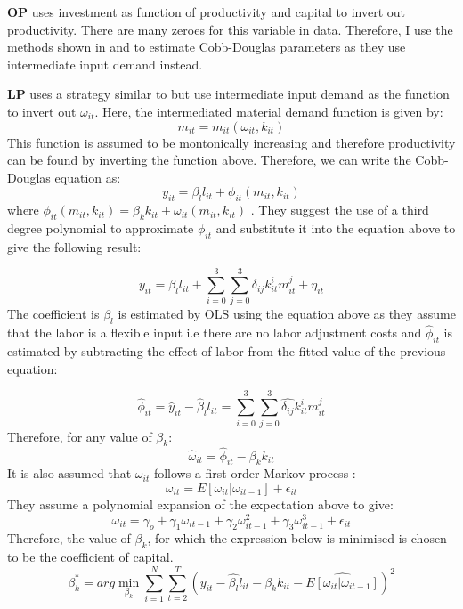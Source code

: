 \documentclass[12pt]{article}
\begin{document}
\textcite{olley1992dynamics} \textbf{OP} uses investment
 as function of productivity and capital to invert out productivity.  There are many zeroes for this variable in
 data. Therefore, I use the  methods shown in \textcite{levinsohn2003estimating} and
\textcite{ackerberg2006structural} to estimate Cobb-Douglas
parameters as they use  intermediate
input demand instead.  


\textcite{levinsohn2003estimating} \textbf{LP} uses a  strategy
similar to \textcite{olley1992dynamics} but use intermediate input demand
as the function to invert out $\omega_{it}$. 
Here, the intermediated material demand function is given by:
$$  m_{it} = m_{it}(\omega_{it}, k_{it})$$
This function is assumed to be montonically increasing and therefore
productivity can be found by inverting the function above. Therefore,
we can write the Cobb-Douglas equation  as: 
$$ y_{it} = \beta_{l}l_{it} + \phi_{it}(m_{it},k_{it})$$
where $\phi_{it}(m_{it},k_{it}) =  \beta_{k}k_{it}+ \omega_{it}(m_{it}, k_{it})$
. They suggest the  use of a third degree polynomial to approximate 
$\phi_{it}$ and substitute it into the equation above to give the
following result: 

$$  y_{it} =  \beta_{l}l_{it} + \sum_{i=0}^{3} \sum_{j=0}^{3}
\delta_{ij}k_{it}^{i}m_{it}^{j} + \eta_{it}$$
The coefficient is $\beta_{l}$ is estimated by OLS using the equation
above as they assume that the labor is a flexible input i.e there are
no labor adjustment costs and $\hat{\phi}_{it}$ is estimated by
subtracting the effect of labor from
the fitted value of the previous equation:


$$ \hat{\phi}_{it} = \hat{y}_{it} - \hat{\beta}_{l}l_{it} =
 \sum_{i=0}^{3} \sum_{j=0}^{3}
\hat{\delta_{ij}}k_{it}^{i}m_{it}^{j}$$
Therefore,  for any value of $\beta_{k}$:
$$\hat{\omega}_{it} = \hat{\phi}_{it} - \beta_{k}k_{it}$$
 It is also assumed that $\omega_{it}$ follows a first order Markov
process : 
$$\omega_{it} = E[\omega_{it}|\omega_{it-1}] + \epsilon_{it}$$
They  assume a polynomial expansion of the expectation above to give:
$$ \omega_{it}=  \gamma_{o}+\gamma_{1}\omega_{it-1} +
\gamma_{2}\omega_{it-1}^2 + \gamma_{3}\omega_{it-1}^3 + \epsilon_{it} $$ 
Therefore, the value of $\beta_{k}$, for which the expression below is
minimised is chosen to be the coefficient of capital.  
\begin{equation}
\beta_{k}^{*} = arg \underset{\beta_{k}}{\min}\sum_{i=1}^{N}\sum_{t=2}^{T} (y_{it} - \hat{\beta_{l}}l_{it} -
\beta_{k}k_{it} - \hat{E[\omega_{it}|\omega_{it-1}]})^2 
\end{equation}
\end{document}
